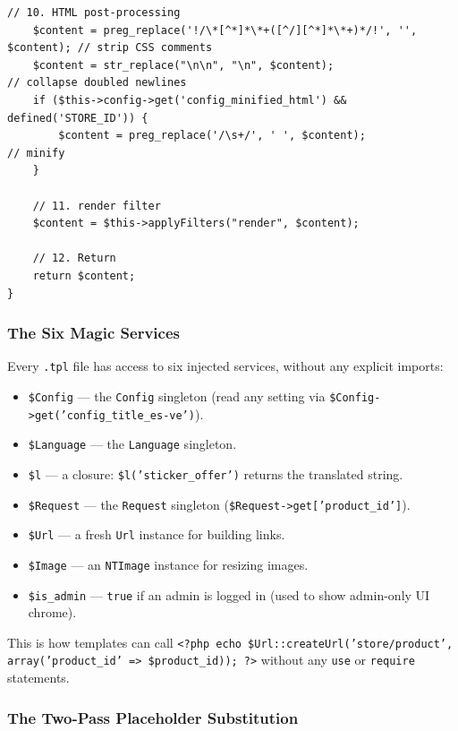 \documentclass[11pt,a4paper]{article}
\begin{document}
\begin{lstlisting}[caption={\texttt{Controller::fetch()} --- the 12-step algorithm (abridged).},label={lst:fetch}]
    // 10. HTML post-processing
    $content = preg_replace('!/\*[^*]*\*+([^/][^*]*\*+)*/!', '', $content); // strip CSS comments
    $content = str_replace("\n\n", "\n", $content);                          // collapse doubled newlines
    if ($this->config->get('config_minified_html') && defined('STORE_ID')) {
        $content = preg_replace('/\s+/', ' ', $content);                     // minify
    }

    // 11. render filter
    $content = $this->applyFilters("render", $content);

    // 12. Return
    return $content;
}
\end{lstlisting}

\subsubsection{The Six Magic Services}

Every \texttt{.tpl} file has access to six injected services,
without any explicit imports:

\begin{itemize}[leftmargin=1.6em,itemsep=2pt]
  \item \texttt{\$Config} --- the \texttt{Config} singleton (read
        any setting via \texttt{\$Config->get('config\_title\_es-ve')}).
  \item \texttt{\$Language} --- the \texttt{Language} singleton.
  \item \texttt{\$l} --- a closure: \texttt{\$l('sticker\_offer')}
        returns the translated string.
  \item \texttt{\$Request} --- the \texttt{Request} singleton
        (\texttt{\$Request->get['product\_id']}).
  \item \texttt{\$Url} --- a fresh \texttt{Url} instance for
        building links.
  \item \texttt{\$Image} --- an \texttt{NTImage} instance for
        resizing images.
  \item \texttt{\$is\_admin} --- \texttt{true} if an admin is
        logged in (used to show admin-only UI chrome).
\end{itemize}

This is how templates can call
\texttt{<?php echo \$Url::createUrl('store/product',
array('product\_id' => \$product\_id)); ?>} without any
\texttt{use} or \texttt{require} statements.

\subsubsection{The Two-Pass Placeholder Substitution}
\end{document}
